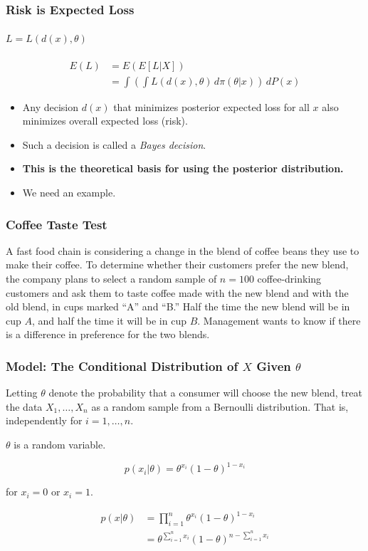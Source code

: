 \documentclass[12pt]{beamer}
\begin{document}
\begin{frame}
	\frametitle{Risk is Expected Loss}
	\framesubtitle{$L = L(d(x),\theta)$}
	
	\[
	\begin{aligned}
		E(L) &= E(E[L|X]) \\[1em]
		&= \int \left(\int L(d(x),\theta)\,d\pi(\theta|x)\right)\,dP(x)
	\end{aligned}
	\]
	
	
	\begin{itemize}[label={\color{blue}$\blacktriangleright$}]
		\item Any decision $d(x)$ that minimizes posterior expected loss for all $x$ also minimizes overall expected loss (risk).
		
		\item Such a decision is called a \textit{Bayes decision}.
		
		\item \textbf{This is the theoretical basis for using the posterior distribution.}
		
		\item We need an example.
	\end{itemize}
	
\end{frame}
\begin{frame}
	\frametitle{Coffee Taste Test}
	
	A fast food chain is considering a change in the blend of coffee beans they use to make their coffee. To determine whether their customers prefer the new blend, the company plans to select a random sample of $n = 100$ coffee-drinking customers and ask them to taste coffee made with the new blend and with the old blend, in cups marked ``A'' and ``B.'' Half the time the new blend will be in cup $A$, and half the time it will be in cup $B$. Management wants to know if there is a difference in preference for the two blends.
	
\end{frame}
\begin{frame}
	\frametitle{Model: The Conditional Distribution of $X$ Given $\theta$}
	
	Letting $\theta$ denote the probability that a consumer will choose the new blend, treat the data $X_1,\ldots,X_n$ as a random sample from a Bernoulli distribution. That is, independently for $i=1,\ldots,n$.
	
	{\color{red}$\theta$ is a random variable.}
	
	\[
	p(x_i|\theta) = \theta^{x_i}(1-\theta)^{1-x_i}
	\]
	
	for $x_i = 0$ or $x_i = 1$.
	
	\[
	\begin{aligned}
		p(x|\theta) &= \prod_{i=1}^n \theta^{x_i}(1-\theta)^{1-x_i} \\
		&= \theta^{\sum_{i=1}^n x_i}(1-\theta)^{n-\sum_{i=1}^n x_i}
	\end{aligned}
	\]
	
\end{frame}
\end{document}
